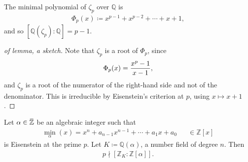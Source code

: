\begin{lemma}

The minimal polynomial of \(\zeta_p\) over \({\mathbb{Q}}\) is
\begin{align*}
\Phi_p(x) \coloneqq x^{p-1} + x^{p-2} + \cdots + x + 1
,\end{align*}
and so \([{\mathbb{Q}}(\zeta_p) : {\mathbb{Q}}] = p-1\).

\end{lemma}

\begin{proof}[of lemma, a sketch]

Note that \(\zeta_p\) is a root of \(\Phi_p\), since
\begin{align*}
\Phi_p(x) = {x^p-1 \over x - 1}
,\end{align*}
and \(\zeta_p\) is a root of the numerator of the right-hand side and
not of the denominator. This is irreducible by Eisenstein's criterion at
\(p\), using \(x\mapsto x+1\).

\end{proof}

\begin{proposition}

Let
\(\alpha\in \mkern 1.5mu\overline{\mkern-1.5mu{\mathbb{Z}}\mkern-1.5mu}\mkern 1.5mu\)
be an algebraic integer such that
\begin{align*}
\min_ \alpha (x) = x^n + a_{n-1}x^{n-1} + \cdots + a_1x + a_0 && \in {\mathbb{Z}}[x]
\end{align*}
is Eisenstein at the prime \(p\). Let
\(K \coloneqq{\mathbb{Q}}( \alpha)\), a number field of degree \(n\).
Then
\begin{align*}
p\nmid[{\mathbb{Z}}_K : {\mathbb{Z}}[ \alpha] ]
.\end{align*}

\end{proposition}

